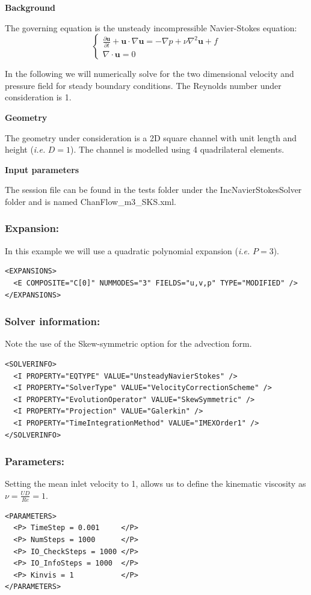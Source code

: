 \textbf{Background}

The governing equation is the unsteady incompressible Navier-Stokes equation:
\begin{equation}
\begin{cases}
\frac{\partial \textbf{u}}{\partial t} + \textbf{u} \cdot \nabla \textbf{u} = - \nabla p + \nu \nabla^2 \textbf{u} + f \\
\nabla \cdot \textbf{u} = 0
\end{cases}
\end{equation}

In the following we will numerically solve for the two dimensional velocity and pressure field for steady boundary conditions. The Reynolds number under consideration is 1.

\textbf{Geometry}

The geometry under consideration is a 2D square channel with unit length and height (\textit{i.e.} $D=1$). The channel is modelled using 4 quadrilateral elements.

\textbf{Input parameters}

The session file can be found in the tests folder under the IncNavierStokesSolver folder and is named ChanFlow\_m3\_SKS.xml.

\subsubsection{Expansion:~} In this example we will use a quadratic polynomial expansion (\textit{i.e.} $P=3$).
\begin{lstlisting}[style=XMLStyle]
<EXPANSIONS>
  <E COMPOSITE="C[0]" NUMMODES="3" FIELDS="u,v,p" TYPE="MODIFIED" />
</EXPANSIONS>
\end{lstlisting}

\subsubsection{Solver information:~} Note the use of the Skew-symmetric option for the advection form.
\begin{lstlisting}[style=XMLStyle]
<SOLVERINFO>
  <I PROPERTY="EQTYPE" VALUE="UnsteadyNavierStokes" />
  <I PROPERTY="SolverType" VALUE="VelocityCorrectionScheme" />
  <I PROPERTY="EvolutionOperator" VALUE="SkewSymmetric" />
  <I PROPERTY="Projection" VALUE="Galerkin" />
  <I PROPERTY="TimeIntegrationMethod" VALUE="IMEXOrder1" />
</SOLVERINFO>
\end{lstlisting}

\subsubsection{Parameters:~} Setting the mean inlet velocity to 1, allows us to define the kinematic viscosity as $\nu = \frac{UD}{Re}=1$.
\begin{lstlisting}[style=XMLStyle]
<PARAMETERS>
  <P> TimeStep = 0.001     </P>
  <P> NumSteps = 1000      </P>
  <P> IO_CheckSteps = 1000 </P>
  <P> IO_InfoSteps = 1000  </P>
  <P> Kinvis = 1           </P>
</PARAMETERS>
\end{lstlisting}

